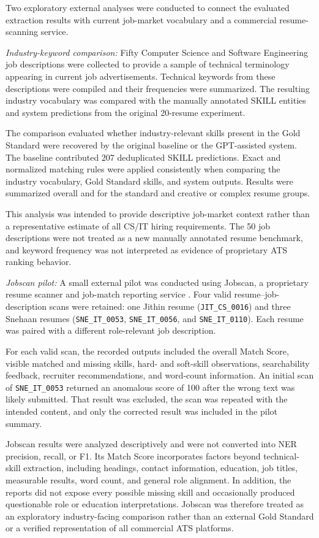 \documentclass[conference]{IEEEtran}
\begin{document}
Two exploratory external analyses were conducted to connect the
evaluated extraction results with current job-market vocabulary and a
commercial resume-scanning service.

\textit{Industry-keyword comparison:}
Fifty Computer Science and Software Engineering job descriptions were
collected to provide a sample of technical terminology appearing in
current job advertisements. Technical keywords from these descriptions
were compiled and their frequencies were summarized. The resulting
industry vocabulary was compared with the manually annotated SKILL
entities and system predictions from the original 20-resume experiment.

The comparison evaluated whether industry-relevant skills present in the
Gold Standard were recovered by the original baseline or the
GPT-assisted system. The baseline contributed 207 deduplicated SKILL
predictions. Exact and normalized matching rules were applied
consistently when comparing the industry vocabulary, Gold Standard
skills, and system outputs. Results were summarized overall and for the
standard and creative or complex resume groups.

This analysis was intended to provide descriptive job-market context
rather than a representative estimate of all CS/IT hiring requirements.
The 50 job descriptions were not treated as a new manually annotated
resume benchmark, and keyword frequency was not interpreted as evidence
of proprietary ATS ranking behavior.

\textit{Jobscan pilot:}
A small external pilot was conducted using Jobscan, a proprietary resume
scanner and job-match reporting service \cite{jobscan2026}. Four valid
resume--job-description scans were retained: one Jithin resume
(\texttt{JIT\_CS\_0016}) and three Snehaan resumes
(\texttt{SNE\_IT\_0053}, \texttt{SNE\_IT\_0056}, and
\texttt{SNE\_IT\_0110}). Each resume was paired with a different
role-relevant job description.

For each valid scan, the recorded outputs included the overall Match
Score, visible matched and missing skills, hard- and soft-skill
observations, searchability feedback, recruiter recommendations, and
word-count information. An initial scan of
\texttt{SNE\_IT\_0053} returned an anomalous score of 100 after the wrong
text was likely submitted. That result was excluded, the scan was
repeated with the intended content, and only the corrected result was
included in the pilot summary.

Jobscan results were analyzed descriptively and were not converted into
NER precision, recall, or F1. Its Match Score incorporates factors beyond
technical-skill extraction, including headings, contact information,
education, job titles, measurable results, word count, and general role
alignment. In addition, the reports did not expose every possible missing
skill and occasionally produced questionable role or education
interpretations. Jobscan was therefore treated as an exploratory
industry-facing comparison rather than an external Gold Standard or a
verified representation of all commercial ATS platforms.
\end{document}
